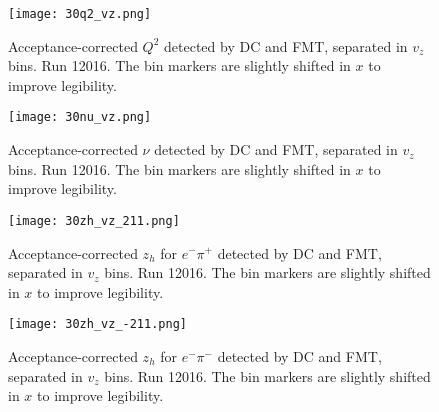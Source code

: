     \begin{figure}
        \centering
        \texttt{[image: 30q2\_vz.png]}
        \caption[Acceptance-corrected $Q^2$ separated in $v_z$ bins]
        {Acceptance-corrected $Q^2$ detected by DC and FMT, separated in $v_z$ bins.
        Run 12016.
        The bin markers are slightly shifted in $x$ to improve legibility.}
        \label{fig::14.30::q2_vz}
    \end{figure}

    \begin{figure}
        \centering
        \texttt{[image: 30nu\_vz.png]}
        \caption[Acceptance-corrected $\nu$ separated in $v_z$ bins]
        {Acceptance-corrected $\nu$ detected by DC and FMT, separated in $v_z$ bins.
        Run 12016.
        The bin markers are slightly shifted in $x$ to improve legibility.}
        \label{fig::14.30::nu_vz}
    \end{figure}

    \begin{figure}
        \centering
        \texttt{[image: 30zh\_vz\_211.png]}
        \caption[Acceptance-corrected $z_h$ for $e^-\pi^+$ separated in $v_z$ bins]
        {Acceptance-corrected $z_h$ for $e^-\pi^+$ detected by DC and FMT, separated in $v_z$ bins.
        Run 12016.
        The bin markers are slightly shifted in $x$ to improve legibility.}
        \label{fig::14.30::zh_211_vz}
    \end{figure}

    \begin{figure}
        \centering
        \texttt{[image: 30zh\_vz\_-211.png]}
        \caption[Acceptance-corrected $z_h$ for $e^-\pi^-$ separated in $v_z$ bins]
        {Acceptance-corrected $z_h$ for $e^-\pi^-$ detected by DC and FMT, separated in $v_z$ bins.
        Run 12016.
        The bin markers are slightly shifted in $x$ to improve legibility.}
        \label{fig::14.30::zh_-211_vz}
    \end{figure}

